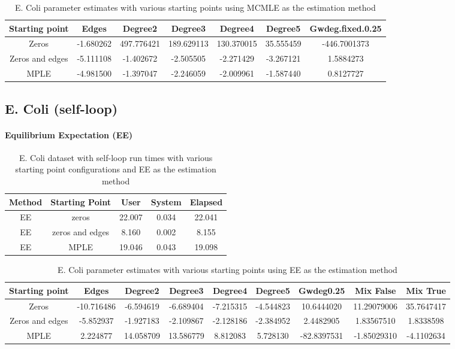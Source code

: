 \begin{table}[H]
\centering
\begin{tabular}{|| c | c | c | c | c | c | c ||}
\hline
Starting point & Edges & Degree2 & Degree3 & Degree4 & Degree5 & Gwdeg.fixed.0.25 \\
\hline
Zeros & -1.680262 & 497.776421 & 189.629113 & 130.370015 & 35.555459 & -446.7001373 \\
\hline
Zeros and edges & -5.111108 & -1.402672 & -2.505505 & -2.271429 & -3.267121 & 1.5884273 \\
\hline
MPLE & -4.981500 & -1.397047 & -2.246059 & -2.009961 & -1.587440 & 0.8127727 \\
\hline
\end{tabular}
\label{t:params_ecoli_mcmle}
\caption{E. Coli parameter estimates with various starting points using MCMLE as the estimation method}
\end{table}

\subsection{E. Coli (self-loop)}

\paragraph{Equilibrium Expectation (EE)}

\begin{table}[H]
\centering
 \begin{tabular}{||c | c | c | c | c||} 
 \hline
 Method & Starting Point & User & System & Elapsed \\
 \hline\hline
 EE & zeros & 22.007	 & 0.034 & 22.041 \\ 
 \hline
 EE & zeros and edges & 8.160 & 0.002 & 8.155 \\
 \hline
 EE & MPLE & 19.046 & 0.043 & 19.098 \\
 \hline
 \end{tabular}
 \label{t:ecoli2_ee}
 \caption{E. Coli dataset with self-loop run times with various starting point configurations and EE as the estimation method}
\end{table}


\begin{table}[H]
\centering
\scriptsize
\begin{tabular}{|| c | c | c | c | c | c | c | c | c ||}
\hline
Starting point & Edges & Degree2 & Degree3 & Degree4 & Degree5 & Gwdeg0.25 & Mix False & Mix True \\
\hline
Zeros & -10.716486 & -6.594619 & -6.689404 & -7.215315 & -4.544823 & 10.6444020 & 11.29079006 & 35.7647417 \\
\hline
Zeros and edges & -5.852937 & -1.927183 &-2.109867 & -2.128186 & -2.384952 & 2.4482905 & 1.83567510 & 1.8338598 \\
\hline
MPLE & 2.224877	& 14.058709 & 13.586779 & 8.812083 & 5.728130 & -82.8397531 & -1.85029310 & -4.1102634 \\
\hline
\end{tabular}
\label{t2:params_ecoli_ee}
\caption{E. Coli parameter estimates with various starting points using EE as the estimation method}
\end{table}


